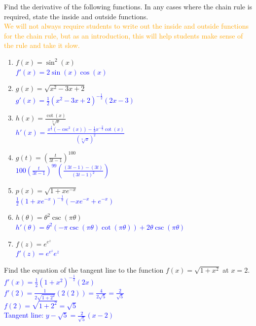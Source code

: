 \documentclass{ximera}
\begin{document}
\begin{exercise}
Find the derivative of the following functions. In any cases where the chain rule is required, state the inside and outside functions.\\
\textcolor{orange}{We will not always require students to write out the inside and outside functions for the chain rule, but as an introduction, this will help students make sense of the rule and take it slow.}
    \begin{enumerate}
        \item $\displaystyle f(x)=\sin^2(x)$ \\
        \textcolor{blue}{ $f'(x)=2\sin(x)\cos(x)$}

        \item $g(x)=\sqrt{x^2-3x+2}$ \\
        \textcolor{blue}{ $g'(x)=\frac12(x^2-3x+2)^{-\frac12}(2x-3)$}

        \item $\displaystyle h(x)=\frac{\cot(x)}{\sqrt[3]{x}}$\\
        \textcolor{blue}{ $h'(x)=\frac{x^{\frac13}(-\csc^2(x))-\frac13x^{-\frac23}\cot(x)}{(\sqrt[3]{x})^2}$}

        \item $g(t)=(\frac{t}{3t-1})^{100}$\\
        \textcolor{blue}{$100(\frac{t}{3t-1})^{99}(\frac{(3t-1)-(3t)}{(3t-1)^2})$}
        
        \item $p(x)=\sqrt{1+xe^{-x}}$\\
        \textcolor{blue}{$\frac{1}{2}(1+xe^{-x})^{-\frac12}(-xe^{-x}+e^{-x})$}
        
        \item $\displaystyle h(\theta)=\theta^2\csc(\pi\theta)$\\
        \textcolor{blue}{ $h'(\theta)=\theta^2(-\pi\csc(\pi\theta)\cot(\pi\theta))+2\theta\csc(\pi\theta)$}

        \item $f(z)=e^{e^z}$\\
        \textcolor{blue}{ $f'(z)=e^{e^z}e^z$}
        
    \end{enumerate}

\end{exercise}

\begin{exercise}
    Find the equation of the tangent line to the function $f(x)=\sqrt{1+x^2}$ at $x=2$.\\
    \textcolor{blue}{$f'(x)=\frac12(1+x^2)^{-\frac12}(2x)$\\
    $f'(2)=\frac{1}{2\sqrt{1+2^2}}(2(2))=\frac{4}{2\sqrt{5}}=\frac{2}{\sqrt{5}}$\\
    $f(2)=\sqrt{1+2^2}=\sqrt{5}$\\
    Tangent line: $y-\sqrt{5}=\frac{2}{\sqrt{5}}(x-2)$}
\end{exercise}
\end{document}
